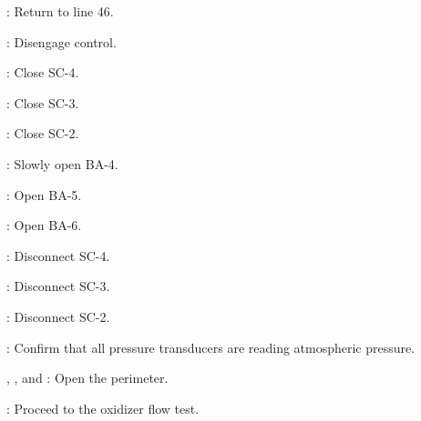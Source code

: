 \begin{checklist}
\begin{checklist}
            \item \ops{}: Return to line 46. 
    \end{checklist}
    \item \control{}: Disengage control. 
    \item \primary{}: Close SC-4.
    \item \primary{}: Close SC-3.
    \item \primary{}: Close SC-2.
    \item \primary{}: Slowly open BA-4.
    \item \primary{}: Open BA-5. 
    \item \primary{}: Open BA-6. 
    \item \primary{}: Disconnect SC-4.
    \item \primary{}: Disconnect SC-3.
    \item \primary{}: Disconnect SC-2.
    \item \daq{}: Confirm that all pressure transducers are reading atmospheric pressure.
    \item \peri{}, \perii{}, and \periii{}: Open the perimeter.
    \item \ops{}: Proceed to the oxidizer flow test. 
\end{checklist}
\setcounter{checklistnum}{0}

\newpage
